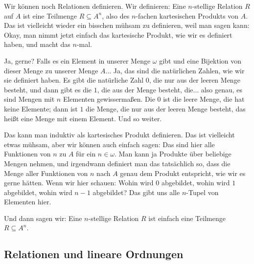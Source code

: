 \begin{spoken-clean}[01:08:36 - 01:12:54]
Wir können noch Relationen definieren. Wir definieren: Eine $n$-stellige Relation $R$ auf $A$ ist eine Teilmenge $R \subseteq A^n$, also des $n$-fachen kartesischen Produkts von $A$. Das ist vielleicht wieder ein bisschen mühsam zu definieren, weil man sagen kann: Okay, man nimmt jetzt einfach das kartesische Produkt, wie wir es definiert haben, und macht das $n$-mal.

Ja, gerne? Falls es ein Element in unserer Menge $\omega$ gibt und eine Bijektion von dieser Menge zu unserer Menge $A$... Ja, das sind die natürlichen Zahlen, wie wir sie definiert haben. Es gibt die natürliche Zahl $0$, die nur aus der leeren Menge besteht, und dann gibt es die $1$, die aus der Menge besteht, die... also genau, es sind Mengen mit $n$ Elementen gewissermaßen. Die $0$ ist die leere Menge, die hat keine Elemente; dann ist $1$ die Menge, die nur aus der leeren Menge besteht, das heißt eine Menge mit einem Element. Und so weiter.
\end{spoken-clean}

\begin{spoken-clean}[01:12:54 - 01:14:35]
Das kann man induktiv als kartesisches Produkt definieren. Das ist vielleicht etwas mühsam, aber wir können auch einfach sagen: Das sind hier alle Funktionen von $n$ zu $A$ für ein $n \in \omega$. Man kann ja Produkte über beliebige Mengen nehmen, und irgendwann definiert man das tatsächlich so, dass die Menge aller Funktionen von $n$ nach $A$ genau dem Produkt entspricht, wie wir es gerne hätten. Wenn wir hier schauen: Wohin wird $0$ abgebildet, wohin wird $1$ abgebildet, wohin wird $n-1$ abgebildet? Das gibt uns alle $n$-Tupel von Elementen hier.

Und dann sagen wir: Eine $n$-stellige Relation $R$ ist einfach eine Teilmenge $R \subseteq A^n$.
\end{spoken-clean}

\subsection{Relationen und lineare Ordnungen}

